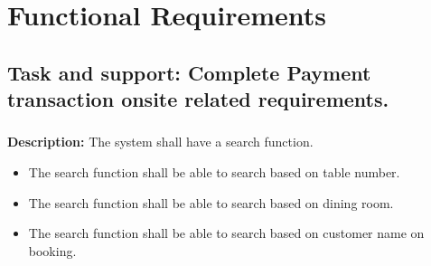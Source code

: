 \documentclass{article}
\begin{document}



\clearpage
\section{Functional Requirements}
\subsection{Task and support: Complete Payment transaction onsite related requirements.}
\subsubsection{}
\textbf{Description:} The system shall have a search function.
\begin{itemize}
    \item The search function shall be able to search based on table number.
    \item The search function shall be able to search based on dining room.
    \item The search function shall be able to search based on  customer name on booking.
\end{itemize}
\end{document}
